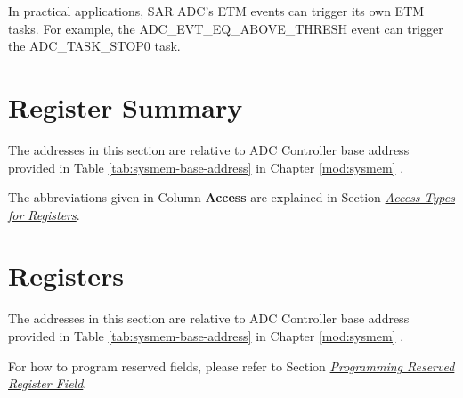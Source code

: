 \documentclass[main\_\_EN.tex]{subfiles}
\begin{document}
In practical applications, SAR ADC's ETM events can trigger its own ETM tasks. For example, the ADC\_EVT\_EQ\_ABOVE\_THRESH event can trigger the ADC\_TASK\_STOP0 task.




\clearpage
\hypertarget{adc-reg-summ}{}
\section{Register Summary}
\label{sec:adc-reg-summ}

The addresses in this section are relative to ADC Controller base address provided in Table \ref{tab:sysmem-base-address} in Chapter \ref{mod:sysmem} \textit{}.

The abbreviations given in Column \textbf{Access} are explained in Section \hyperref[glossary-access-types]{\textit{Access Types for Registers}}.







\clearpage
\section{Registers}

The addresses in this section are relative to ADC Controller base address provided in Table \ref{tab:sysmem-base-address} in Chapter \ref{mod:sysmem} \textit{}.

For how to program reserved fields, please refer to Section \hyperref[programming-reserved-field]{\textit{Programming Reserved Register Field}}.


\end{document}
